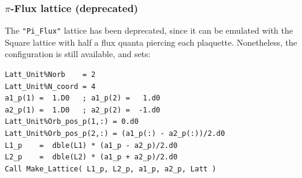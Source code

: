 \subsubsection{$\pi$-Flux lattice (deprecated)}

The \texttt{"Pi\_Flux"} lattice has been deprecated, since it can be emulated with the Square lattice with half a flux quanta piercing each plaquette. Nonetheless, the configuration is still available, and sets:
\begin{lstlisting}[style=fortran]
Latt_Unit%Norb    = 2
Latt_Unit%N_coord = 4
a1_p(1) =  1.D0   ; a1_p(2) =   1.d0
a2_p(1) =  1.D0   ; a2_p(2) =  -1.d0
Latt_Unit%Orb_pos_p(1,:) = 0.d0 
Latt_Unit%Orb_pos_p(2,:) = (a1_p(:) - a2_p(:))/2.d0 
L1_p    =  dble(L1) * (a1_p - a2_p)/2.d0
L2_p    =  dble(L2) * (a1_p + a2_p)/2.d0
Call Make_Lattice( L1_p, L2_p, a1_p, a2_p, Latt )
\end{lstlisting}

